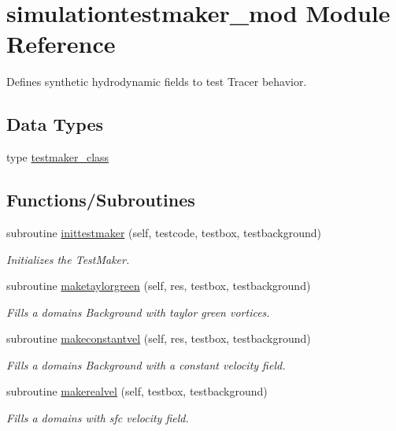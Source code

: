 \hypertarget{namespacesimulationtestmaker__mod}{}\section{simulationtestmaker\+\_\+mod Module Reference}
\label{namespacesimulationtestmaker__mod}


Defines synthetic hydrodynamic fields to test Tracer behavior.  


\subsection*{Data Types}
\begin{DoxyCompactItemize}
\item 
type \mbox{\hyperlink{structsimulationtestmaker__mod_1_1testmaker__class}{testmaker\+\_\+class}}
\end{DoxyCompactItemize}
\subsection*{Functions/\+Subroutines}
\begin{DoxyCompactItemize}
\item 
subroutine \mbox{\hyperlink{namespacesimulationtestmaker__mod_a4ad5df056a516e03a3d1c17f6d3046cf}{inittestmaker}} (self, testcode, testbox, testbackground)
\begin{DoxyCompactList}\small\item\em Initializes the Test\+Maker. \end{DoxyCompactList}\item 
subroutine \mbox{\hyperlink{namespacesimulationtestmaker__mod_a45bbd32a561c88c18498d88f2d540cc4}{maketaylorgreen}} (self, res, testbox, testbackground)
\begin{DoxyCompactList}\small\item\em Fills a domain\textquotesingle{}s Background with taylor green vortices. \end{DoxyCompactList}\item 
subroutine \mbox{\hyperlink{namespacesimulationtestmaker__mod_a59ecca693ee5dfe472e2694c9399f0f0}{makeconstantvel}} (self, res, testbox, testbackground)
\begin{DoxyCompactList}\small\item\em Fills a domain\textquotesingle{}s Background with a constant velocity field. \end{DoxyCompactList}\item 
subroutine \mbox{\hyperlink{namespacesimulationtestmaker__mod_aefae35a08583d3983b922b33b8c74225}{makerealvel}} (self, testbox, testbackground)
\begin{DoxyCompactList}\small\item\em Fills a domain\textquotesingle{}s with sfc velocity field. \end{DoxyCompactList}\end{DoxyCompactItemize}
